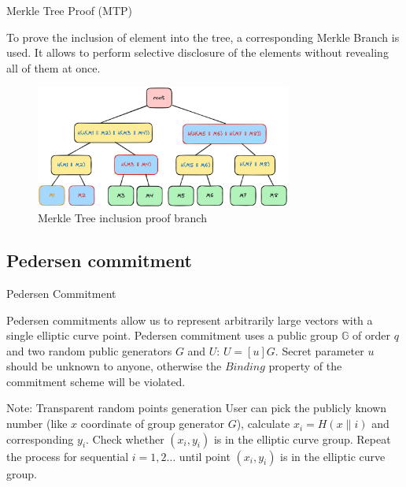 \documentclass{zkdl-presentation-template}
\begin{document}
    \begin{frame}{Merkle Tree Proof (MTP)}

        To prove the inclusion of element into the tree, a corresponding Merkle Branch is used. It allows to perform selective
        disclosure of the elements without revealing all of them at once.

        \begin{figure}
            \centering
            \includegraphics[width=0.75\textwidth]{images/lecture_5/MerkleTreeProof.png}
            \caption{Merkle Tree inclusion proof branch}
        \end{figure}

    \end{frame}

    \subsection{Pedersen commitment}

    \begin{frame}{Pedersen Commitment}

        Pedersen commitments allow us to represent arbitrarily large vectors with a single elliptic curve point. 
        Pedersen commitment uses a public group $\mathbb{G}$ of order $q$ and two random public generators
        $G$ and $U$: $U = [u]G$. Secret parameter $u$ should be unknown to anyone, otherwise the $\textit{Binding}$ 
        property of the commitment scheme will be violated.
    
        \begin{alertblock}{Note: Transparent random points generation}
            User can pick the publicly known number (like $x$ coordinate of group generator $G$), calculate $x_i = H(x \parallel i)$
            and corresponding $y_i$. Check whether $(x_i, y_i)$ is in the elliptic curve group. Repeat the process for sequential $i = 1, 2 \ldots$
            until point $(x_i, y_i)$ is in the elliptic curve group.
        \end{alertblock}    

    \end{frame}
\end{document}
